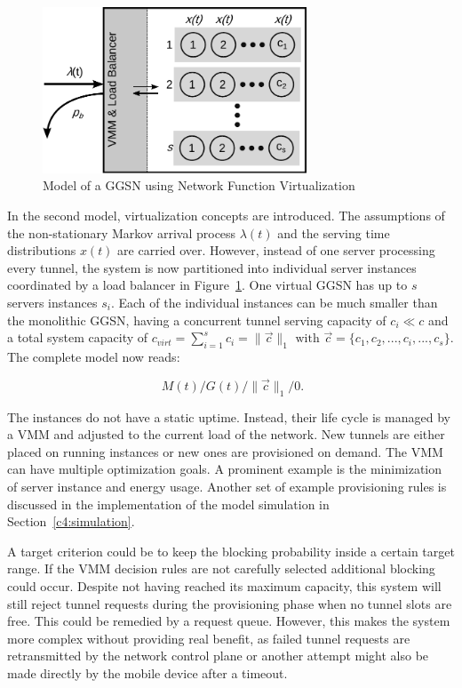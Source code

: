 \begin{figure}[htb]
	\centering
	\includegraphics[width=0.7\textwidth]{images/ggsn-virtualized.pdf}
	\caption{Model of a GGSN using Network Function Virtualization}
\label{c4:fig:model-ggsn-virtualized}
\end{figure}

In the second model, virtualization concepts are introduced. The assumptions of the non-stationary Markov arrival process $\lambda(t)$ and the serving time distributions $x(t)$ are carried over. However, instead of one server processing every tunnel, the system is now partitioned into individual server instances coordinated by a load balancer in Figure~\ref{c4:fig:model-ggsn-virtualized}. One virtual \gls{GGSN} has up to $s$ servers instances $s_i$.  Each of the individual instances can be much smaller than the monolithic \gls{GGSN}, having a concurrent tunnel serving capacity of $c_i \ll c$ and a total system capacity of $c_{virt} = \sum_{i=1}^{s} c_i = \| \overrightarrow{c}\|_1 \text{ with } \overrightarrow{c} = \{c_1, c_2, ... ,c_i, ... ,c_s\}$. %
The complete model now reads:

\begin{equation}
\phantom{.}M(t)/G(t)/\|\overrightarrow{c}\|_1/0\text{.}
\end{equation}

The instances do not have a static uptime. Instead, their life cycle is managed by a \gls{VMM} and adjusted to the current load of the network. New tunnels are either placed on running instances or new ones are provisioned on demand. The \gls{VMM} can have multiple optimization goals. A prominent example is the minimization of server instance and energy usage.  Another set of example provisioning rules is discussed in the implementation of the model simulation in Section~\ref{c4:simulation}. 

A target criterion could be to keep the blocking probability inside a certain target range. If the \gls{VMM} decision rules are not carefully selected additional blocking could occur. Despite not having reached its maximum capacity, this system will still reject tunnel requests during the provisioning phase when no tunnel slots are free. This could be remedied by a request queue. However, this makes the system more complex without providing real benefit, as failed tunnel requests are retransmitted by the network control plane or another attempt might also be made directly by the mobile device after a timeout.

